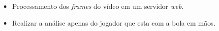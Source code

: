 \begin{itemize}
    \item<1> Processamento dos \textit{frames} do vídeo em um servidor \textit{web}.
    \item<1> Realizar a análise apenas do jogador que esta com a bola em mãos.
\end{itemize}